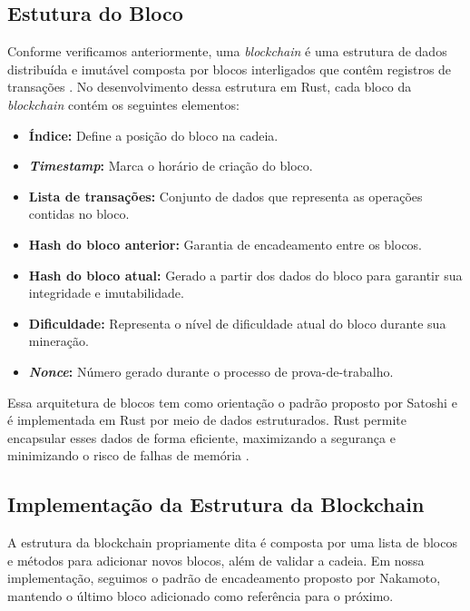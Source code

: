 \documentclass[article,12pt,oneside,a4paper,english,brazil]{unifil}
\begin{document}
\begin{Spacing}{1.5}
\subsection*{Estutura do Bloco}

Conforme verificamos anteriormente, uma \textit{blockchain} é uma estrutura de dados distribuída e imutável composta por blocos interligados que contêm registros de transações \cite{nakamoto2008bitcoin}. No desenvolvimento dessa estrutura em Rust, cada bloco da \textit{blockchain} contém os seguintes elementos:

\begin{itemize}
    \item \textbf{Índice:} Define a posição do bloco na cadeia.
    \item \textbf{\textit{Timestamp}:} Marca o horário de criação do bloco.
    \item \textbf{Lista de transações:} Conjunto de dados que representa as operações contidas no bloco.
    \item \textbf{Hash do bloco anterior:} Garantia de encadeamento entre os blocos.
    \item \textbf{Hash do bloco atual:} Gerado a partir dos dados do bloco para garantir sua integridade e imutabilidade.
    \item \textbf{Dificuldade:} Representa o nível de dificuldade atual do bloco durante sua mineração.
    \item  \textbf{\textit{Nonce}:} Número gerado durante o processo de prova-de-trabalho.

\end{itemize}

Essa arquitetura de blocos tem como orientação o padrão proposto por Satoshi e é implementada em Rust por meio de dados estruturados. Rust permite encapsular esses dados de forma eficiente, maximizando a segurança e minimizando o risco de falhas de memória \cite{matsakis2014rust}.

\subsection*{Implementação da Estrutura da Blockchain}

A estrutura da blockchain propriamente dita é composta por uma lista de blocos e métodos para adicionar novos blocos, além de validar a cadeia. Em nossa implementação, seguimos o padrão de encadeamento proposto por Nakamoto, mantendo o último bloco adicionado como referência para o próximo.


\end{Spacing}
\end{document}
